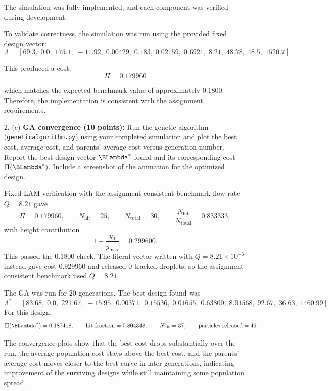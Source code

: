 \documentclass{article}
\begin{document}
\begin{enumerate}
\begin{answer}
The simulation was fully implemented, and each component was verified during development.

To validate correctness, the simulation was run using the provided fixed design vector:
\[
\Lambda = [69.3,\; 0.0,\; 175.1,\; -11.92,\; 0.00429,\; 0.183,\; 0.02159,\; 0.6921,\; 8.21,\; 48.78,\; 48.5,\; 1520.7]
\]

This produced a cost:
\[
\Pi = 0.179960
\]

which matches the expected benchmark value of approximately 0.1800. Therefore, the implementation is consistent with the assignment requirements.

\end{answer}



\newpage
\item[2. (c)] \textbf{GA convergence (10 points):}
Run the genetic algorithm (\texttt{geneticalgorithm.py}) using your completed simulation and plot the best cost,
average cost, and parents' average cost versus generation number.
Report the best design vector $\BLambda^*$ found and its corresponding cost $\Pi(\BLambda^*)$.
Include a screenshot of the animation for the optimized design.

\begin{answer}
Fixed-LAM verification with the assignment-consistent benchmark flow rate $Q=8.21$ gave
\[
\Pi = 0.179960,\qquad N_{\text{hit}} = 25,\qquad N_{\text{total}} = 30,\qquad \frac{N_{\text{hit}}}{N_{\text{total}}} = 0.833333,
\]
with height contribution
\[
1-\frac{y_0}{y_{\max}} = 0.299600.
\]
This passed the $0.1800$ check. The literal vector written with $Q=8.21\times 10^{-6}$ instead gave cost $0.929960$ and released $0$ tracked droplets, so the assignment-consistent benchmark used $Q=8.21$.

The GA was run for $20$ generations. The best design found was
\[
\Lambda^* = 
[83.68,\; 0.0,\; 221.67,\; -15.95,\; 0.00371,\; 0.15536,\; 0.01655,\; 0.63800,\; 8.91568,\; 92.67,\; 36.63,\; 1460.99]
\]
For this design,
\[
\Pi(\BLambda^*) = 0.187418,
\qquad
\text{hit fraction} = 0.804348,
\qquad
N_{\text{hit}} = 37,
\qquad
\text{particles released} = 46.
\]

The convergence plots show that the best cost drops substantially over the run, the average population cost stays above the best cost, and the parents' average cost moves closer to the best curve in later generations, indicating improvement of the surviving designs while still maintaining some population spread.


\end{answer}
\end{enumerate}
\end{document}
